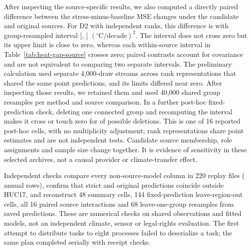 After inspecting the source-specific results, we also computed a directly paired difference between the stress-minus-baseline MSE changes under the candidate and original sources. For D2 with independent ranks, this difference is \HGRInteraction{} with group-resampled interval [\HGRInteractionLow, \HGRInteractionHigh] $({}^{\circ}\mathrm{C}/\mathrm{decade})^2$. The interval does not cross zero but its upper limit is close to zero, whereas each within-source interval in Table~\ref{tab:heat-gap-source} crosses zero; paired contrasts account for covariance and are not equivalent to comparing two separate intervals. The preliminary calculation used separate 4,000-draw streams across rank representations that shared the same point predictions, and its limits differed near zero. After inspecting those results, we retained them and used 40,000 shared group resamples per method and source comparison. In a further post-hoc fixed-prediction check, deleting one connected group and recomputing the interval makes it cross or touch zero for \HGRInfluenceCross{} of \HGRInfluenceGroups{} possible deletions. This is one of 16 reported post-hoc cells, with no multiplicity adjustment; rank representations share point estimates and are not independent tests. Candidate source membership, role assignments and sample size change together. It is evidence of sensitivity in these selected archives, not a causal provider or climate-transfer effect.

Independent checks compare every non-source-model column in 220 replay files (\HGRFeatureRows{} annual rows), confirm that strict and original predictions coincide outside HUC17, and reconstruct 48 summary cells, 144 fixed-prediction leave-region-out cells, all 16 paired source interactions and 68 leave-one-group resamples from saved predictions. These are numerical checks on shared observations and fitted models, not an independent climate, sensor or legal-rights evaluation. The first attempt to distribute tasks to eight processes failed to deserialize a task; the same plan completed serially with receipt checks.
